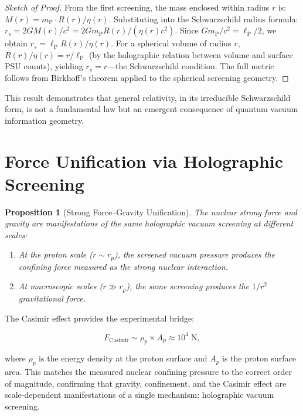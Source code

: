 \documentclass[12pt, a4paper]{article}
\theoremstyle{plain}
\newtheorem{proposition}[theorem]{Proposition}
\theoremstyle{definition}
\theoremstyle{remark}
\newcommand{\lP}{\ell_{\mathrm{P}}}
\newcommand{\mP}{m_{\mathrm{P}}}
\newcommand{\rp}{r_p}
\begin{document}
\begin{proof}[Sketch of Proof]
  From the first screening, the mass enclosed within radius $r$ is:
  $M(r) = \mP \cdot R(r) / \eta(r)$. Substituting into the Schwarzschild
  radius formula: $r_s = 2GM(r)/c^2 = 2G\mP R(r) / (\eta(r) c^2)$.
  Since $G\mP/c^2 = \lP/2$, we obtain $r_s = \lP R(r)/\eta(r)$.
  For a spherical volume of radius $r$, $R(r)/\eta(r) = r/\lP$ (by the
  holographic relation between volume and surface PSU counts), yielding
  $r_s = r$---the Schwarzschild condition. The full metric follows from
  Birkhoff's theorem applied to the spherical screening geometry. \qedhere
\end{proof}

This result demonstrates that general relativity, in its irreducible
Schwarzschild form, is not a fundamental law but an emergent consequence
of quantum vacuum information geometry.

\section{Force Unification via Holographic Screening}\label{sec:unification}

\begin{proposition}[Strong Force--Gravity Unification]\label{prop:unification}
  The nuclear strong force and gravity are manifestations of the same
  holographic vacuum screening at different scales:
  \begin{enumerate}[label=(\roman*)]
    \item At the proton scale ($r \sim \rp$), the screened vacuum pressure
      produces the confining force measured as the strong nuclear interaction.
    \item At macroscopic scales ($r \gg \rp$), the same screening produces
      the $1/r^2$ gravitational force.
  \end{enumerate}
\end{proposition}

The Casimir effect provides the experimental bridge:

\begin{equation}\label{eq:casimir}
  F_{\text{Casimir}} \sim \rho_p \times A_p \approx 10^4 \; \text{N},
\end{equation}

where $\rho_p$ is the energy density at the proton surface and $A_p$ is
the proton surface area. This matches the measured nuclear confining
pressure to the correct order of magnitude, confirming that gravity,
confinement, and the Casimir effect are scale-dependent manifestations of
a single mechanism: holographic vacuum screening.
\end{document}

